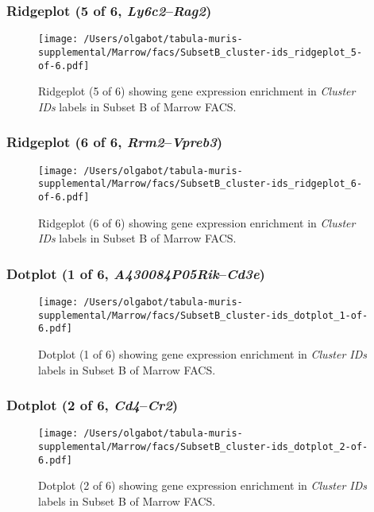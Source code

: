 \clearpage

\subsubsection{Ridgeplot (5 of 6, \emph{Ly6c2}--\emph{Rag2})}
\begin{figure}[h]
\centering
\texttt{[image: /Users/olgabot/tabula-muris-supplemental/Marrow/facs/SubsetB\_cluster-ids\_ridgeplot\_5-of-6.pdf]}

\caption{ Ridgeplot (5 of 6)  showing gene expression enrichment in \emph{Cluster IDs} labels in Subset B of Marrow FACS. }
\end{figure}


\clearpage

\subsubsection{Ridgeplot (6 of 6, \emph{Rrm2}--\emph{Vpreb3})}
\begin{figure}[h]
\centering
\texttt{[image: /Users/olgabot/tabula-muris-supplemental/Marrow/facs/SubsetB\_cluster-ids\_ridgeplot\_6-of-6.pdf]}

\caption{ Ridgeplot (6 of 6)  showing gene expression enrichment in \emph{Cluster IDs} labels in Subset B of Marrow FACS. }
\end{figure}


\clearpage

\subsubsection{Dotplot (1 of 6, \emph{A430084P05Rik}--\emph{Cd3e})}
\begin{figure}[h]
\centering
\texttt{[image: /Users/olgabot/tabula-muris-supplemental/Marrow/facs/SubsetB\_cluster-ids\_dotplot\_1-of-6.pdf]}

\caption{ Dotplot (1 of 6)  showing gene expression enrichment in \emph{Cluster IDs} labels in Subset B of Marrow FACS. }
\end{figure}


\clearpage

\subsubsection{Dotplot (2 of 6, \emph{Cd4}--\emph{Cr2})}
\begin{figure}[h]
\centering
\texttt{[image: /Users/olgabot/tabula-muris-supplemental/Marrow/facs/SubsetB\_cluster-ids\_dotplot\_2-of-6.pdf]}

\caption{ Dotplot (2 of 6)  showing gene expression enrichment in \emph{Cluster IDs} labels in Subset B of Marrow FACS. }
\end{figure}


